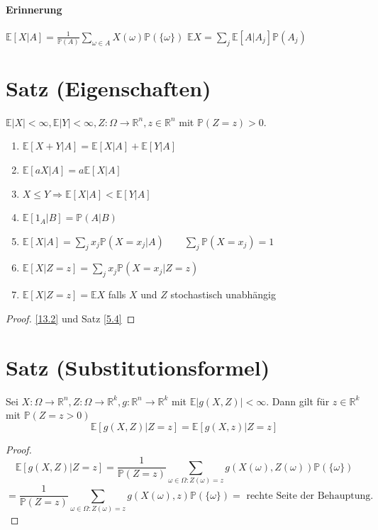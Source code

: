 \documentclass[a4paper,11pt,notitlepage]{report}
\newcommand{\R}{{\ensuremath{\mathbb{R}}}}
\newcommand{\Prim}{{\ensuremath{\mathbb{P}}}}
\newcommand{\E}{{\ensuremath{\mathbb{E}}}}
\begin{document}
\paragraph{Erinnerung}
$\E [X | A] = \frac{1}{\Prim(A)} \sum\limits_{\omega \in A}{X(\omega) \Prim(\{\omega\})}$
\newline
$\E X = \sum\limits_{j}{\E [A|A_j] \Prim(A_j)}$

\section{Satz (Eigenschaften)}
$\E |X| < \infty, \E |Y| < \infty, Z \colon \Omega \rightarrow \R^n, z \in \R^n$ mit $\Prim(Z=z)>0$.
\begin{enumerate}
	\item $\E [X+Y | A] = \E [X|A] + \E[Y | A]$
	\item $\E [aX | A] = a \E [X|A]$
	\item $X \leq Y \Rightarrow \E [X|A] < \E [Y|A]$
	\item $\E [1_A | B] = \Prim(A|B)$
	\item $\E [X| A] = \sum\limits_{j}{x_j \Prim(X= x_j | A)} \qquad \sum\limits_{j}{\Prim(X=x_j)}=1$
	\item $\E [X | Z=z] = \sum\limits_j{x_j \Prim(X=x_j | Z=z)}$
	\item $\E [X| Z=z] = \E X$ falls $X$ und $Z$ stochastisch unabhängig
\end{enumerate}

\begin{proof}
\ref{13.2} und Satz \ref{5.4}
\end{proof}

\section{Satz (Substitutionsformel)}
Sei $X \colon \Omega \rightarrow \R^n, Z \colon \Omega \rightarrow \R^k, g \colon \R^n \rightarrow \R^k$ mit $\E |g(X,Z)| < \infty$. Dann gilt für $z \in \R^k$ mit $\Prim(Z=z>0)$
$$\E [g(X,Z)| Z = z ] = \E [g(X,z) | Z=z]$$

\begin{proof}
	$$\E [g(X,Z)| Z = z ] = \frac{1}{\Prim(Z=z)} \sum\limits_{\omega \in \Omega \colon Z(\omega) = z}{g(X(\omega), Z(\omega)) \Prim(\{\omega\})}$$
	$$ = \frac{1}{\Prim(Z=z)} \sum\limits_{\omega \in \Omega \colon Z(\omega) = z}{g(X(\omega), z) \Prim(\{\omega\})} = \text{ rechte Seite der Behauptung.}$$
\end{proof}
\end{document}
